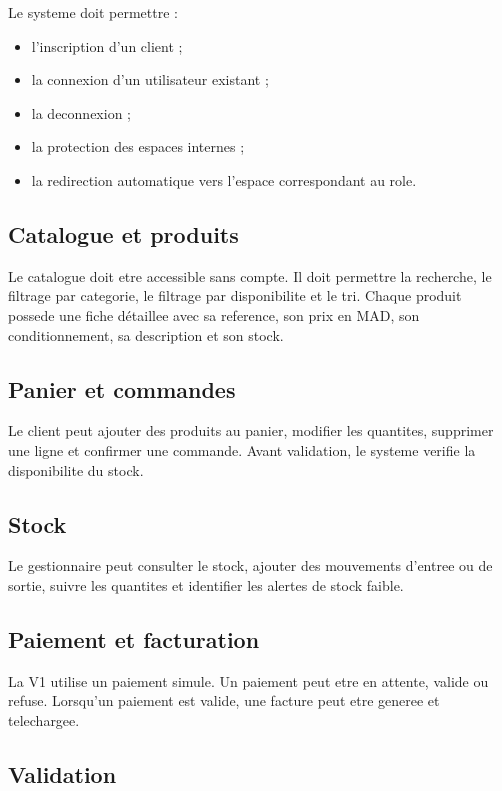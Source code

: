 \documentclass[12pt,a4paper]{report}
\begin{document}
Le systeme doit permettre :

\begin{itemize}
  \item l'inscription d'un client ;
  \item la connexion d'un utilisateur existant ;
  \item la deconnexion ;
  \item la protection des espaces internes ;
  \item la redirection automatique vers l'espace correspondant au role.
\end{itemize}

\subsection{Catalogue et produits}

Le catalogue doit etre accessible sans compte. Il doit permettre la recherche, le filtrage par categorie, le filtrage par disponibilite et le tri. Chaque produit possede une fiche détaillee avec sa reference, son prix en MAD, son conditionnement, sa description et son stock.

\subsection{Panier et commandes}

Le client peut ajouter des produits au panier, modifier les quantites, supprimer une ligne et confirmer une commande. Avant validation, le systeme verifie la disponibilite du stock.

\subsection{Stock}

Le gestionnaire peut consulter le stock, ajouter des mouvements d'entree ou de sortie, suivre les quantites et identifier les alertes de stock faible.

\subsection{Paiement et facturation}

La V1 utilise un paiement simule. Un paiement peut etre en attente, valide ou refuse. Lorsqu'un paiement est valide, une facture peut etre generee et telechargee.

\subsection{Validation}
\end{document}
